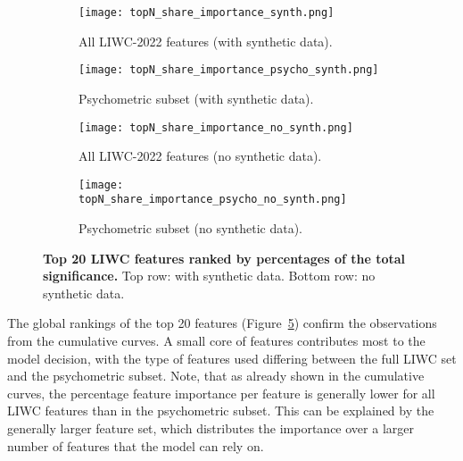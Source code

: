 \begin{figure}[H]
  \centering
  
  \begin{subfigure}[t]{0.49\textwidth}
    \centering
    \texttt{[image: topN\_share\_importance\_synth.png]}
    \caption{All LIWC-2022 features (with synthetic data).}
    \label{fig:synth_all}
  \end{subfigure}\hfill
  \begin{subfigure}[t]{0.49\textwidth}
    \centering
    \texttt{[image: topN\_share\_importance\_psycho\_synth.png]}
    \caption{Psychometric subset (with synthetic data).}
    \label{fig:synth_psycho}
  \end{subfigure}
  
  \vspace{0.5cm}
  

  \begin{subfigure}[t]{0.49\textwidth}
    \centering
    \texttt{[image: topN\_share\_importance\_no\_synth.png]}
    \caption{All LIWC-2022 features (no synthetic data).}
    \label{fig:no_synth_all}
  \end{subfigure}\hfill
  \begin{subfigure}[t]{0.49\textwidth}
    \centering
    \texttt{[image: topN\_share\_importance\_psycho\_no\_synth.png]}
    \caption{Psychometric subset (no synthetic data).}
    \label{fig:no_synth_psycho}
  \end{subfigure}

  \caption[Top 20 LIWC features ranked by percentages of the total significance.]{\textbf{Top 20 LIWC features ranked by percentages of the total significance.} 
  Top row: with synthetic data. Bottom row: no synthetic data.}
  \label{fig:global_feature_importance_combined}
\end{figure}

The global rankings of the top 20 features (Figure~\ref{fig:global_feature_importance_combined}) confirm the observations from the cumulative curves. A small core of features contributes most to the model decision, with the type of features used differing between the full LIWC set and the psychometric subset. Note, that as already shown in the cumulative curves, the percentage feature importance per feature is generally lower for all LIWC features than in the psychometric subset. This can be explained by the generally larger feature set, which distributes the importance over a larger number of features that the model can rely on.

